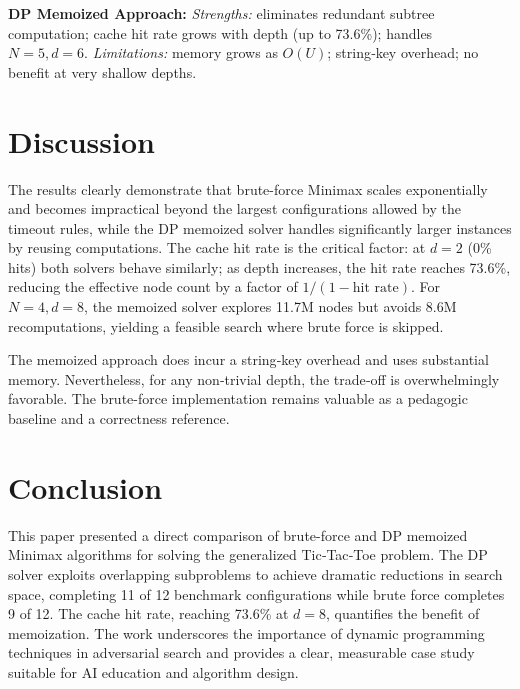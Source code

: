\documentclass[conference]{IEEEtran}
\begin{document}
\textbf{DP Memoized Approach:}
\textit{Strengths:} eliminates redundant subtree computation; cache hit
rate grows with depth (up to 73.6\%); handles $N=5, d=6$.
\textit{Limitations:} memory grows as $O(U)$; string‑key overhead; no
benefit at very shallow depths.

\section{Discussion}

The results clearly demonstrate that brute-force Minimax scales
exponentially and becomes impractical beyond the largest configurations
allowed by the timeout rules, while the DP memoized solver handles
significantly larger instances by reusing computations. The cache hit
rate is the critical factor: at $d=2$ (0\% hits) both solvers behave
similarly; as depth increases, the hit rate reaches 73.6\%, reducing the
effective node count by a factor of $1/(1-\text{hit rate})$. For
$N=4, d=8$, the memoized solver explores 11.7M nodes but avoids
8.6M recomputations, yielding a feasible search where brute force is
skipped.

The memoized approach does incur a string‑key overhead and uses
substantial memory. Nevertheless, for any non‑trivial depth, the trade‑off
is overwhelmingly favorable. The brute-force implementation remains
valuable as a pedagogic baseline and a correctness reference.

\section{Conclusion}

This paper presented a direct comparison of brute-force and DP memoized
Minimax algorithms for solving the generalized Tic‑Tac‑Toe problem.
The DP solver exploits overlapping subproblems to achieve dramatic
reductions in search space, completing 11 of 12 benchmark configurations
while brute force completes 9 of 12. The cache hit rate, reaching
73.6\% at $d=8$, quantifies the benefit of memoization. The work
underscores the importance of dynamic programming techniques in
adversarial search and provides a clear, measurable case study suitable
for AI education and algorithm design.
\end{document}
